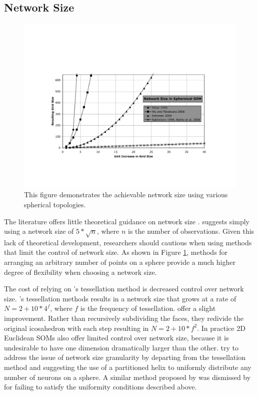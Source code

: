 \documentclass[10pt,titlepage]{article}
\begin{document}
\subsection{Network Size}
\begin{figure}
\centering
\includegraphics[width=\linewidth]{networkSize.pdf}
\caption{This figure demonstrates the achievable network size using various
spherical topologies.}
\label{fig:nSize}
\end{figure}
The literature offers little theoretical guidance on network size
\citep{cho1996}.  \cite{toolbox} suggests simply using a network size of
\(5*\sqrt {n}\), where \(n\) is the number of observations. Given this lack of
theoretical development, researchers should cautious when using methods that
limit the control of network size.  As shown in Figure \ref{fig:nSize},
methods for arranging an arbitrary number of points on a sphere provide a much
higher degree of flexibility when choosing a network size.

The cost of relying on \citeauthor{ritter99}'s tessellation method is decreased
control over network size. \citeauthor{ritter99}'s tessellation methods results
in a network size that grows at a rate of \(N=2+10*4^f\), where $f$ is the
frequency of tessellation. \cite{wu2006} offer a slight improvement. Rather than
recursively subdividing the faces, they redivide the original icosahedron with
each step resulting in \(N=2+10*f^2\).  In practice 2D Euclidean SOMs also offer
limited control over network size, because it is undesirable to have one dimension
dramatically larger than the other.  \cite{Nishio:2006fk} try to address the
issue of network size granularity by departing from the tessellation method and
suggesting the use of a partitioned helix to uniformly distribute any number of
neurons on a sphere.  A similar method proposed by \cite{Rakhmanov94} was
dismissed by \cite{wu2005} for failing to satisfy the uniformity conditions
described above.
\end{document}
